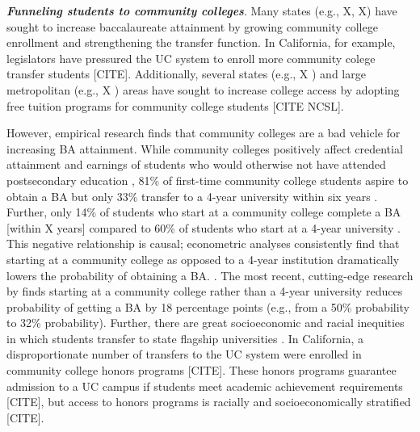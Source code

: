 \documentclass[twoside]{article}
\begin{document}
\textbf{\textit{Funneling students to community colleges}}. Many states (e.g., X, X) have sought to increase baccalaureate attainment by growing community college enrollment and strengthening the transfer function. In California, for example, legislators have pressured the UC system to enroll more community colege transfer students [CITE]. Additionally, several states (e.g., X ) and large metropolitan (e.g., X ) areas have sought to increase college access by adopting free tuition programs for community college students [CITE NCSL].  

However, empirical research finds that community colleges are a bad vehicle for increasing BA attainment. While community colleges positively affect credential attainment and earnings of students who would otherwise not have attended postsecondary education \citep[e.g., ][]{RN4404}, 81\% of first-time community college students aspire to obtain a BA but only 33\% transfer to a 4-year university within six years \citep{RN4406}. Further, only 14\% of students who start at a community college complete a BA [within X years] compared to 60\% of students who start at a 4-year university \citep{RN4406}.  This negative relationship is causal; econometric analyses consistently find that starting at a community college as opposed to a 4-year institution dramatically lowers the probability of obtaining a BA. \citep[e.g., ][]{RN4284,RN2261,RN4292,RN4405}. The most recent, cutting-edge research by \cite{RN4404} finds starting at a community college rather than a 4-year university reduces probability of getting a BA by 18 percentage points (e.g., from a 50\% probability to 32\% probability).  Further, there are great socioeconomic and racial inequities in which students transfer to state flagship universities \citep{RN1492}. In California, a disproportionate number of transfers to the UC system were enrolled in community college honors programs [CITE]. These honors programs guarantee admission to a UC campus if students meet academic achievement requirements [CITE], but access to honors programs is racially and socioeconomically stratified [CITE].
\end{document}
